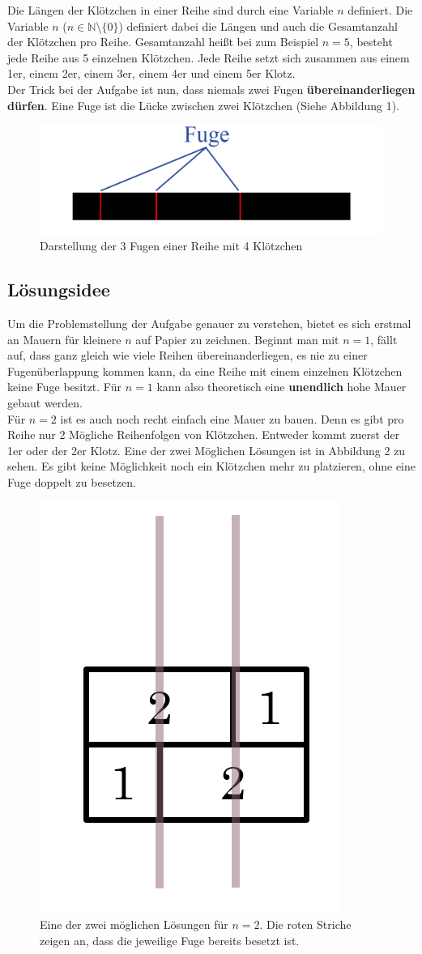 \documentclass[a4paper,12pt]{article}
\begin{document}
Die Längen der Klötzchen in einer Reihe sind durch eine Variable $n$ definiert.
Die Variable $n$ ($n \in \mathbb{N}$\textbackslash$\{0\}$) definiert dabei die Längen und auch die Gesamtanzahl der Klötzchen pro Reihe.
Gesamtanzahl heißt bei zum Beispiel $n = 5$, besteht jede Reihe aus 5 einzelnen Klötzchen. 
Jede Reihe setzt sich zusammen aus einem 1er, einem 2er, einem 3er, einem 4er und einem 5er Klotz.
\\[0.4cm]
Der Trick bei der Aufgabe ist nun, dass niemals zwei Fugen \textbf{übereinanderliegen dürfen}.
Eine Fuge ist die Lücke zwischen zwei Klötzchen (Siehe Abbildung 1).
\begin{figure}[H]
    \centering
    \includegraphics[width=0.8\linewidth]{Bilder/Aufgabe1/Definition_Fuge.png}
    \caption{Darstellung der 3 Fugen einer Reihe mit 4 Klötzchen}
\end{figure}

\subsection{Lösungsidee}
Um die Problemstellung der Aufgabe genauer zu verstehen, bietet es sich erstmal an Mauern für kleinere $n$ auf Papier zu zeichnen.
Beginnt man mit $n = 1$, fällt auf, dass ganz gleich wie viele Reihen übereinanderliegen, es nie zu einer Fugenüberlappung kommen kann, da eine Reihe mit einem einzelnen Klötzchen keine Fuge besitzt.
Für $n = 1$ kann also theoretisch eine \textbf{unendlich} hohe Mauer gebaut werden.
\\[0.4cm]
Für $n = 2$ ist es auch noch recht einfach eine Mauer zu bauen. Denn es gibt pro Reihe nur 2 Mögliche Reihenfolgen von Klötzchen. Entweder kommt zuerst der 1er oder der 2er Klotz. Eine der zwei Möglichen Lösungen ist in Abbildung 2 zu sehen. Es gibt keine Möglichkeit noch ein Klötzchen mehr zu platzieren, ohne eine Fuge doppelt zu besetzen.
\begin{figure}[H]
    \centering
    \includegraphics[width=0.3\linewidth]{Bilder/Aufgabe1/Loesung_N2.png}
    \caption{Eine der zwei möglichen Lösungen für $n = 2$. Die roten Striche zeigen an, dass die jeweilige Fuge bereits besetzt ist.}
\end{figure}
\end{document}
